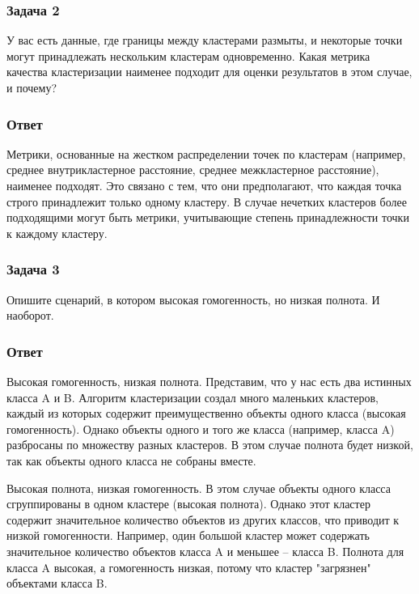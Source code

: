 \subsubsection{Задача 2}

У вас есть данные, где границы между кластерами размыты, и некоторые точки могут принадлежать нескольким кластерам одновременно. Какая метрика качества кластеризации наименее подходит для оценки результатов в этом случае, и почему?

\subsubsection{Ответ}

Метрики, основанные на жестком распределении точек по кластерам (например, среднее внутрикластерное расстояние, среднее межкластерное расстояние), наименее подходят. Это связано с тем, что они предполагают, что каждая точка строго принадлежит только одному кластеру. В случае нечетких кластеров более подходящими могут быть метрики, учитывающие степень принадлежности точки к каждому кластеру.

\subsubsection{Задача 3}

Опишите сценарий, в котором высокая гомогенность, но низкая полнота. И наоборот.

\subsubsection{Ответ}

Высокая гомогенность, низкая полнота. Представим, что у нас есть два истинных класса A и B. Алгоритм кластеризации создал много маленьких кластеров, каждый из которых содержит преимущественно объекты одного класса (высокая гомогенность). Однако объекты одного и того же класса (например, класса A) разбросаны по множеству разных кластеров. В этом случае полнота будет низкой, так как объекты одного класса не собраны вместе.

Высокая полнота, низкая гомогенность. В этом случае объекты одного класса сгруппированы в одном кластере (высокая полнота). Однако этот кластер содержит значительное количество объектов из других классов, что приводит к низкой гомогенности. Например, один большой кластер может содержать значительное количество объектов класса A и меньшее -- класса B. Полнота для класса A высокая, а гомогенность низкая, потому что кластер "загрязнен" объектами класса B.

